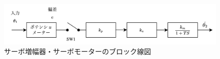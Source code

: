 \begin{figure}
    \centering
    \includegraphics[width=0.8\linewidth]{src/figures/servo-motor/servo-motor.png}
    \caption{サーボ増幅器・サーボモーターのブロック線図}\label{fig:servo-motor}
\end{figure}
